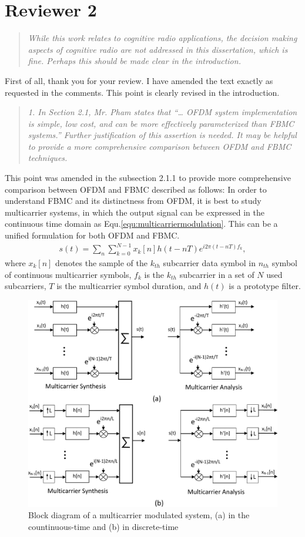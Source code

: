 \documentclass{article}
\begin{document}
\section*{Reviewer 2}
\begin{quote}
\emph{While this work relates to cognitive radio applications, the decision making aspects of cognitive radio are not addressed in this dissertation, which is fine. Perhaps this should be made clear in the introduction.}
\end{quote}
First of all, thank you for your review. I have amended the text exactly as requested in the comments.
This point is clearly revised in the introduction.

\begin{quote}
\emph{1. In Section 2.1, Mr. Pham states that “… OFDM system implementation is simple, low cost, and can be more effectively parameterized than FBMC systems.” Further justification of this assertion is needed. It may be helpful to provide a more comprehensive comparison between OFDM and FBMC techniques.}
\end{quote}
This point was amended in the subsection 2.1.1 to provide more comprehensive comparison between OFDM and FBMC described as follows:
In order to understand FBMC and its distinctness from OFDM, it is best to study multicarrier systems, in which the output signal can be expressed in the continuous time domain as Equ.\ref{equ:multicarriermodulation}. 
This can be a unified formulation for both OFDM and FBMC.
\begin{eqnarray}
\label{equ:multicarriermodulation}
s(t) = \sum_{n}\sum_{k  = 0}^{N-1} x_{k}[n] h(t-nT)e^{i2\pi (t-nT)f_{k}},
\end{eqnarray}	
where $x_{k}[n]$ denotes the sample of the $k_{th}$ subcarrier data symbol in $n_{th}$ symbol of continuous multicarrier symbols, $f_{k}$ is the $k_{th}$ subcarrier in a set of $N$ used subcarriers, $T$ is the multicarrier symbol duration, and $h(t)$ is a prototype filter.
\begin{figure}
	\centerline{\includegraphics [width=0.8\columnwidth] {../Figures/multucarrier_system} }
	\caption{Block diagram of a multicarrier modulated system, (a) in the countinuous-time and (b) in discrete-time}
	\label{fig:multicarrier-block}
\end{figure}
\end{document}
